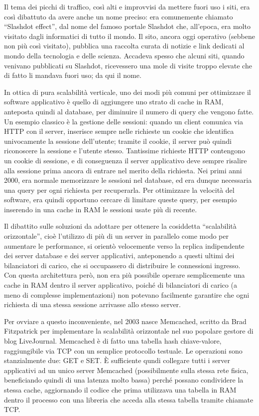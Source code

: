 Il tema dei picchi di traffico, così alti e improvvisi da mettere fuori uso i siti,
era così dibattuto da avere anche un nome preciso: era comunemente chiamato ``Slashdot
effect'', dal nome del famoso portale Slashdot che, all'epoca, era molto visitato dagli
informatici di tutto il mondo. Il sito, ancora oggi operativo (sebbene non più così
visitato), pubblica una raccolta curata di notizie e link dedicati al mondo della tecnologia
e delle scienza. Accadeva spesso che alcuni siti, quando venivano pubblicati su Slashdot,
ricevessero una mole di visite troppo elevate che di fatto li mandava fuori uso; da qui
il nome.

In ottica di pura scalabilità verticale, uno dei modi più comuni per ottimizzare il software
applicativo è quello di aggiungere uno strato di cache in RAM, anteposta quindi al database,
per diminuire il numero di query che vengono fatte. Un esempio classico è la gestione delle
sessioni: quando un client comunica via HTTP con il server, inserisce sempre nelle richieste
un cookie che identifica univocamente la sessione dell'utente; tramite il cookie, il server
può quindi riconoscere la sessione e l'utente stesso. Tantissime richieste HTTP contengono un
cookie di sessione, e di conseguenza il server applicativo deve sempre risalire alla sessione
prima ancora di entrare nel merito della richiesta. Nei primi anni 2000, era normale memorizzare
le sessioni nel database, ed era dunque necessaria una query per ogni richiesta per recuperarla.
Per ottimizzare la velocità del software, era quindi opportuno cercare di limitare queste query, per esempio inserendo in una cache in RAM le sessioni usate più di recente.

Il dibattito sulle soluzioni da adottare per ottenere la cosiddetta ``scalabilità orizzontale'',
cioè l'utilizzo di più di un server in parallelo come modo per aumentare le performance,
si orientò velocemente verso la replica indipendente dei server database
e dei server applicativi, anteponendo a questi ultimi dei bilanciatori di carico, che
si occupassero di distribuire le connessioni ingresso. Con questa architettura però,
non era più possibile operare semplicemente una cache in RAM dentro il server applicativo, poiché di bilanciatori di carico (a meno di complesse implementazioni) non potevano facilmente garantire
che ogni richiesta di una stessa sessione arrivasse allo stesso server.

Per ovviare a questo inconveniente, nel 2003 nasce Memcached, scritto da Brad Fitzpatrick per implementare la scalabilità orizzontale nel suo popolare gestore di blog LiveJournal.
Memcached è di fatto una tabella hash chiave-valore, raggiungibile via TCP con un
semplice protocollo testuale. Le operazioni sono stanzialmente due: GET e SET. È sufficiente
qundi collegare tutti i server applicativi ad un unico server Memcached (possibilmente
sulla stessa rete fisica, beneficiando quindi di una latenza molto bassa) perché possano
condividere la stessa cache, aggiornando il codice che prima utilizzava una tabella in RAM
dentro il processo con una libreria che acceda alla stessa tabella tramite chiamate TCP.

